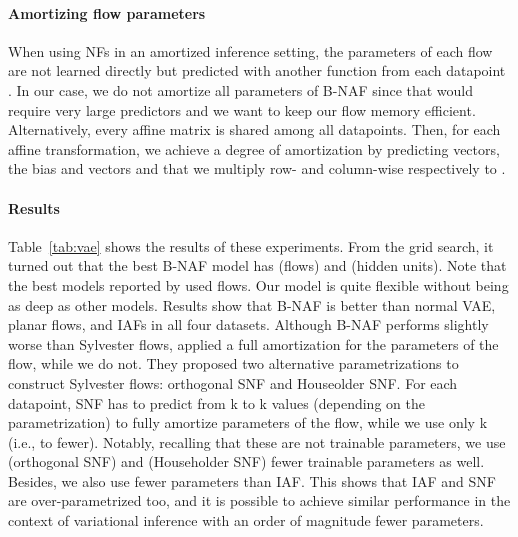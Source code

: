 \documentclass[letterpaper]{article}
\begin{document}
\paragraph{Amortizing flow parameters}
When using NFs in an amortized inference setting, the parameters of each flow are not learned directly but predicted with another function from each datapoint \citep{rezende2015variational}. In our case, we do not amortize all parameters of B-NAF since that would require very large predictors and we want to keep our flow memory efficient. Alternatively, every affine matrix  is shared among all datapoints. Then, for each affine transformation, we achieve a degree of amortization by predicting  vectors, the bias  and  vectors  and  that we multiply row- and column-wise respectively to .

\paragraph{Results}
Table~\ref{tab:vae} shows the results of these experiments. From the grid search, it turned out that the best B-NAF model has  (flows) and  (hidden units). Note that the best models reported by \citet{berg2018sylvester} used  flows. Our model is quite flexible without being as deep as other models. Results show that B-NAF is better than normal VAE, planar flows, and IAFs in all four datasets. Although B-NAF performs slightly worse than Sylvester flows, \citet{berg2018sylvester} applied a full amortization for the parameters of the flow, while we do not. They proposed two alternative parametrizations to construct Sylvester flows: orthogonal SNF and Houseolder SNF. For each datapoint, SNF has to predict from k to k values (depending on the parametrization) to fully amortize parameters of the flow, while we use only k (i.e.,  to  fewer). Notably, recalling that these are not trainable parameters, we use  (orthogonal SNF) and  (Householder SNF) fewer trainable parameters as well. Besides, we also use  fewer parameters than IAF. This shows that IAF and SNF are over-parametrized too, and it is possible to achieve similar performance in the context of variational inference with an order of magnitude fewer parameters.
\end{document}
